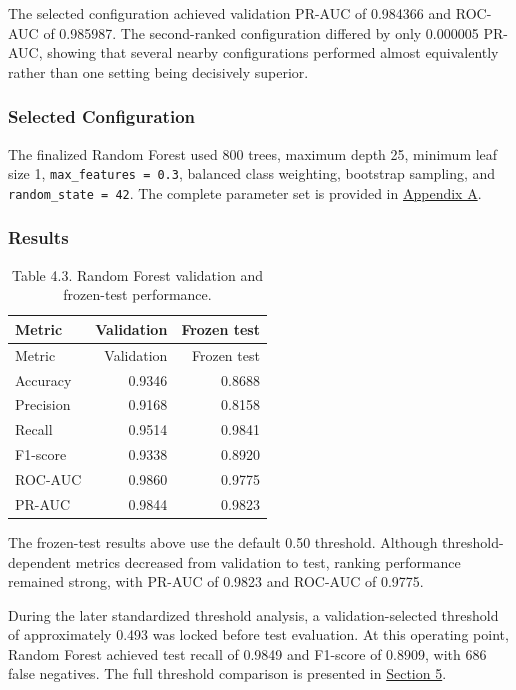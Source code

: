 \documentclass[
  canadian,
  12pt,
]{article}
\let\reportOrigSubsubsection\subsubsection
\renewcommand{\subsubsection}{\par\Needspace*{5\baselineskip}\reportOrigSubsubsection}%
\begin{document}
The selected configuration achieved validation PR-AUC of 0.984366 and
ROC-AUC of 0.985987. The second-ranked configuration differed by only
0.000005 PR-AUC, showing that several nearby configurations performed
almost equivalently rather than one setting being decisively superior.

\subsubsection{Selected Configuration}\label{selected-configuration-2}

The finalized Random Forest used 800 trees, maximum depth 25, minimum
leaf size 1, \texttt{max\_features\ =\ 0.3}, balanced class weighting,
bootstrap sampling, and \texttt{random\_state\ =\ 42}. The complete
parameter set is provided in \hyperref[sec-app-a]{Appendix A}.

\subsubsection{Results}\label{sec-4-3-results}

\begin{longtable}[]{@{}lrr@{}}
\caption{Table 4.3. Random Forest validation and frozen-test
performance.}\tabularnewline
\toprule\noalign{}
Metric & Validation & Frozen test \\
\midrule\noalign{}
\endfirsthead
\toprule\noalign{}
Metric & Validation & Frozen test \\
\midrule\noalign{}
\endhead
\bottomrule\noalign{}
\endlastfoot
Accuracy & 0.9346 & 0.8688 \\
Precision & 0.9168 & 0.8158 \\
Recall & 0.9514 & 0.9841 \\
F1-score & 0.9338 & 0.8920 \\
ROC-AUC & 0.9860 & 0.9775 \\
PR-AUC & 0.9844 & 0.9823 \\
\end{longtable}

The frozen-test results above use the default 0.50 threshold. Although
threshold-dependent metrics decreased from validation to test, ranking
performance remained strong, with PR-AUC of 0.9823 and ROC-AUC of
0.9775.

During the later standardized threshold analysis, a validation-selected
threshold of approximately 0.493 was locked before test evaluation. At
this operating point, Random Forest achieved test recall of 0.9849 and
F1-score of 0.8909, with 686 false negatives. The full threshold
comparison is presented in \hyperref[sec-5]{Section 5}.
\end{document}

